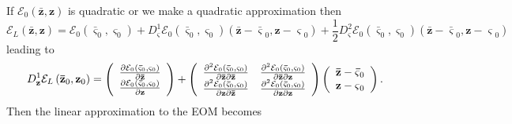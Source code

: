 \documentclass[aps,preprint]{revtex4}%
\begin{document}
If $\mathcal{E}_{0}\left(  \mathbf{\bar{z}},\mathbf{z}\right)  $ is quadratic
or we make a quadratic approximation then
\begin{equation}
\mathcal{E}_{L}\left(  \mathbf{\bar{z}},\mathbf{z}\right)  =\mathcal{E}%
_{0}\left(  \mathbf{\bar{\varsigma}}_{0},\mathbf{\varsigma}_{0}\right)
+D_{\mathbf{\varsigma}}^{1}\mathcal{E}_{0}\left(  \mathbf{\bar{\varsigma}}%
_{0},\mathbf{\varsigma}_{0}\right)  \left(  \mathbf{\bar{z}-\bar{\varsigma}%
}_{0},\mathbf{z-\varsigma}_{0}\right)  +\frac{1}{2}D_{\mathbf{\varsigma}}%
^{2}\mathcal{E}_{0}\left(  \mathbf{\bar{\varsigma}}_{0},\mathbf{\varsigma}%
_{0}\right)  \left(  \mathbf{\bar{z}-\bar{\varsigma}}_{0},\mathbf{z-\varsigma
}_{0}\right)
\end{equation}
leading to
\begin{equation}
D_{\mathbf{z}}^{1}\mathcal{E}_{L}\left(  \mathbf{\bar{z}}_{0},\mathbf{z}%
_{0}\right)  =\left(
\begin{array}
[c]{c}%
\frac{\partial\mathcal{E}_{0}\left(  \mathbf{\bar{\varsigma}}_{0}%
,\mathbf{\varsigma}_{0}\right)  }{\partial\mathbf{\bar{z}}}\\
\frac{\partial\mathcal{E}_{0}\left(  \mathbf{\bar{\varsigma}}_{0}%
,\mathbf{\varsigma}_{0}\right)  }{\partial\mathbf{z}}%
\end{array}
\right)  +\left(
\begin{array}
[c]{cc}%
\frac{\partial^{2}\mathcal{E}_{0}\left(  \mathbf{\bar{\varsigma}}%
_{0},\mathbf{\varsigma}_{0}\right)  }{\partial\mathbf{\bar{z}}\partial
\mathbf{\bar{z}}} & \frac{\partial^{2}\mathcal{E}_{0}\left(  \mathbf{\bar
{\varsigma}}_{0},\mathbf{\varsigma}_{0}\right)  }{\partial\mathbf{\bar{z}%
}\partial\mathbf{z}}\\
\frac{\partial^{2}\mathcal{E}_{0}\left(  \mathbf{\bar{\varsigma}}%
_{0},\mathbf{\varsigma}_{0}\right)  }{\partial\mathbf{z}\partial
\mathbf{\bar{z}}} & \frac{\partial^{2}\mathcal{E}_{0}\left(  \mathbf{\bar
{\varsigma}}_{0},\mathbf{\varsigma}_{0}\right)  }{\partial\mathbf{z}%
\partial\mathbf{z}}%
\end{array}
\right)  \left(
\begin{array}
[c]{c}%
\mathbf{\bar{z}-\bar{\varsigma}}_{0}\\
\mathbf{z-\varsigma}_{0}%
\end{array}
\right)  .
\end{equation}
Then the linear approximation to the EOM becomes
\end{document}
